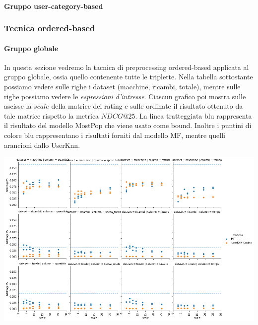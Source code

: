 \paragraph{Gruppo user-category-based}

\subsubsection{Tecnica ordered-based}

\paragraph{Gruppo globale}
In questa sezione vedremo la tacnica di preprocessing ordered-based applicata al gruppo globale, ossia quello contenente tutte le triplette.
Nella tabella sottostante possiamo vedere sulle righe i dataset (macchine, ricambi, totale), mentre sulle righe possiamo vedere le \textit{espressioni d'intresse}. Ciascun grafico poi mostra sulle ascisse la $scale$ della matrice dei rating e sulle ordinate il risultato ottenuto da tale matrice rispetto la metrica $NDCG@25$. La linea tratteggiata blu rappresenta il risultato del modello MostPop che viene usato come bound.
Inoltre i puntini di colore blu rappresentano i risultati forniti dal modello MF, mentre quelli arancioni dallo UserKnn.

\includegraphics[width=16cm]{figures/risultati_ordered_globale.png}


